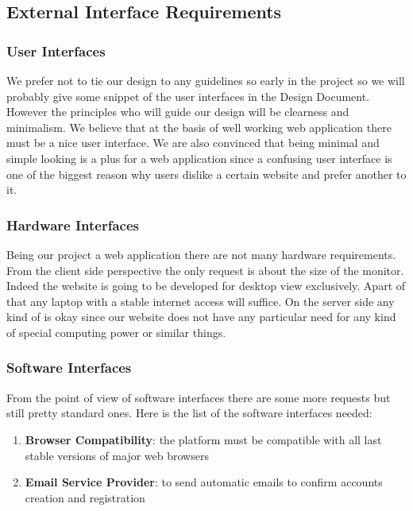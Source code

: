 

\subsection{External Interface Requirements}

\subsubsection{User Interfaces}
We prefer not to tie our design to any guidelines so early in the project so we will probably give some snippet of the user interfaces in the Design Document. However the principles who will guide our design will be clearness and minimalism. We believe that at the basis of well working web application there must be a nice user interface. We are also convinced that being minimal and simple looking is a plus for a web application since a confusing user interface is one of the biggest reason why users dislike a certain website and prefer another to it.

\subsubsection{Hardware Interfaces}
Being our project a web application there are not many hardware requirements. From the client side perspective the only request is about the size of the monitor. Indeed the website is going to be developed for desktop view exclusively. Apart of that any laptop with a stable internet access will suffice. On the server side any kind of is okay since our website does not have any particular need for any kind of special computing power or similar things.

\subsubsection{Software Interfaces}
From the point of view of software interfaces there are some more requests but still pretty standard ones. Here is the list of the software interfaces needed:
\begin{enumerate}
    \item  \textbf{Browser Compatibility}: the platform must be compatible with all last stable versions of major web browsers
    \item \textbf{Email Service Provider}: to send automatic emails to confirm accounts creation and registration
\end{enumerate}
